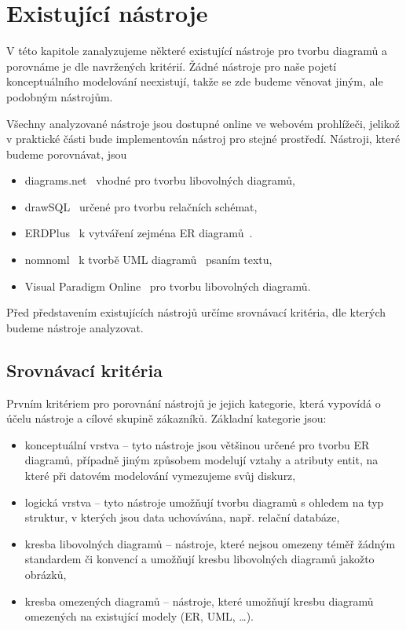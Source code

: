\chapter{Existující nástroje}\label{chapter:existujici-nastroje}

V této kapitole zanalyzujeme některé existující nástroje pro tvorbu diagramů a porovnáme je dle navržených kritérií.
Žádné nástroje pro naše pojetí konceptuálního modelování neexistují, takže se zde budeme věnovat jiným, ale podobným nástrojům.

Všechny analyzované nástroje jsou dostupné online ve webovém prohlížeči, jelikož v praktické části bude implementován nástroj pro stejné prostředí.
Nástroji, které budeme porovnávat, jsou
\begin{itemize}
  \item diagrams.net~\cite{drawio_2023} vhodné pro tvorbu libovolných diagramů,
  \item drawSQL~\cite{drawsql_2021} určené pro tvorbu relačních schémat,
  \item ERDPlus~\cite{erdplus_2023} k vytváření zejména ER diagramů~\cite{chen_er_1976}.
  \item nomnoml~\cite{nomnoml_2022} k tvorbě UML diagramů~\cite{omg_uml_2017} psaním textu,
  \item Visual Paradigm Online~\cite{vpo_2022} pro tvorbu libovolných diagramů.
\end{itemize}

Před představením existujících nástrojů určíme srovnávací kritéria, dle kterých budeme nástroje analyzovat.

\section{Srovnávací kritéria}

Prvním kritériem pro porovnání nástrojů je jejich kategorie, která vypovídá o účelu nástroje a cílové skupině zákazníků.
Základní kategorie jsou:
\begin{itemize}
  \item konceptuální vrstva -- tyto nástroje jsou většinou určené pro tvorbu ER diagramů, případně jiným způsobem modelují vztahy a atributy entit, na které při datovém modelování vymezujeme svůj diskurz,
  \item logická vrstva -- tyto nástroje umožňují tvorbu diagramů s ohledem na typ struktur, v kterých jsou data uchovávána, např. relační databáze,
  \item kresba libovolných diagramů -- nástroje, které nejsou omezeny téměř žádným standardem či konvencí a umožňují kresbu libovolných diagramů jakožto obrázků,
  \item kresba omezených diagramů -- nástroje, které umožňují kresbu diagramů omezených na existující modely (ER, UML, \dots).
\end{itemize}

